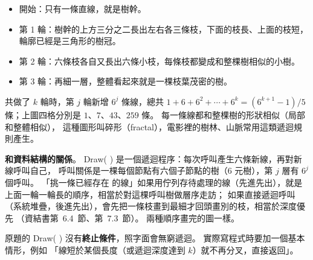 \begin{pastsoln}
\begin{itemize}
\item 開始：只有一條直線，就是樹幹。
\item 第 1 輪：樹幹的上方三分之二長出左右各三條枝，下面的枝長、上面的枝短，輪廓已經是三角形的樹冠。
\item 第 2 輪：六條枝各自又長出六條小枝，每條枝都變成和整棵樹相似的小樹。
\item 第 3 輪：再細一層，整體看起來就是一棵枝葉茂密的樹。
\end{itemize}
共做了 $k$ 輪時，第 $j$ 輪新增 $6^j$ 條線，總共 $1 + 6 + 6^2 + \cdots + 6^k = (6^{k+1} - 1)/5$
條；上圖四格分別是 $1$、$7$、$43$、$259$ 條。 每一條線都和整棵樹的形狀相似（局部和整體相似），
這種圖形叫碎形（fractal），電影裡的樹林、山脈常用這類遞迴規則產生。

\textbf{和資料結構的關係}。 Draw( ) 是一個遞迴程序：每次呼叫產生六條新線，再對新線呼叫自己，
呼叫關係是一棵每個節點有六個子節點的樹（6 元樹），第 $j$ 層有 $6^j$ 個呼叫。 「挑一條已經存在
的線」如果用佇列存待處理的線（先進先出），就是上面一輪一輪長的順序，相當於對這棵呼叫樹做層序走訪；
如果直接遞迴呼叫（系統堆疊，後進先出），會先把一條枝畫到最細才回頭畫別的枝，相當於深度優先
（資結書第~6.4~節、第~7.3~節）。 兩種順序畫完的圖一樣。

原題的 Draw( ) 沒有\textbf{終止條件}，照字面會無窮遞迴。 實際寫程式時要加一個基本情形，例如
「線短於某個長度（或遞迴深度達到 $k$）就不再分叉，直接返回」。
\end{pastsoln}
